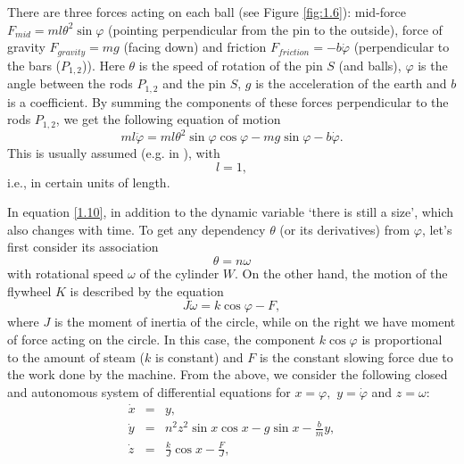 \begin{example}
There are three forces acting on each ball (see Figure \ref{fig:1.6}): mid-force $F_{mid}=ml\theta ^{2}\sin \varphi $ (pointing perpendicular from the pin to the outside), force of gravity $F_{gravity}=mg$ (facing down) and friction $F_{friction}=-b\dot{\varphi}$ (perpendicular to the bars ($P_{1,2}$)). Here $\theta $ is the speed of rotation of the pin $S$ (and balls), $\varphi $ is the angle between the rods $P_{1,2}$ and the pin $S$, $g$ is the acceleration of the earth and $b$ is a coefficient. By summing the components of these forces perpendicular to the rods $P_{1,2}$, we get the following equation of motion
\begin{equation}
\label{1.10}
ml\ddot{\varphi}=ml\theta ^{2}\sin \varphi \cos \varphi -mg\sin \varphi -b \dot{\varphi}.
\end{equation}
This is usually assumed (e.g. in \cite{Pon}), with
$$
l=1,
$$
i.e., in certain units of length.

In equation \eqref{1.10}, in addition to the dynamic variable `there is still a size', which also changes with time. To get any dependency $\theta $ (or its derivatives) from $\varphi $, let's first consider its association
$$
\theta =n\omega
$$
with rotational speed $\omega$ of the cylinder $W$. On the other hand, the motion of the flywheel $K$ is described by the equation
$$
J\dot{\omega}=k\cos \varphi -F,
$$
where $J$ is the moment of inertia of the circle, while on the right we have moment of force acting on the circle. In this case, the component $k\cos \varphi $ is proportional to the amount of steam ($k$ is constant) and $F$ is the constant slowing force due to the work done by the machine. From the above, we consider the following closed and autonomous system of differential equations for $x=\varphi ,$ $y=\dot{\varphi}$ and $z=\omega :$
\begin{equation}
\label{1.11}
\begin{array}{lll}
\dot{x} & = & y, \\
\dot{y} & = & n^{2}z^{2}\sin x\cos x-g\sin x-\frac{b}{m}y, \\
\dot{z} & = & \frac{k}{J}\cos x-\frac{F}{J},%
\end{array}
\end{equation}


\end{example}
